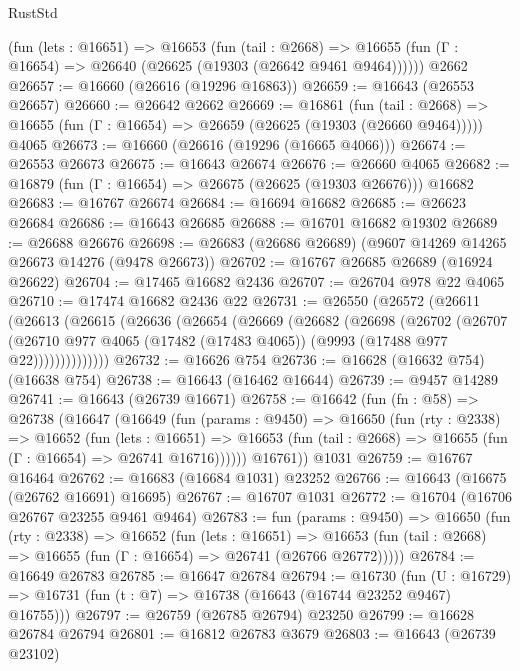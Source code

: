 \begin{lexlean}{RustStd}
\begin{coremodule}
    (fun (lets : @16651) =>
    @16653
      (fun (tail : @2668) =>
      @16655 (fun (Γ : @16654) => @26640 (@26625 (@19303 (@26642 @9461 @9464))))))
    @2662
@26657 := @16660 (@26616 (@19296 @16863))
@26659 := @16643 (@26553 @26657)
@26660 := @26642 @2662
@26669 := @16861
    (fun (tail : @2668) => @16655 (fun (Γ : @16654) => @26659 (@26625 (@19303 (@26660 @9464)))))
    @4065
@26673 := @16660 (@26616 (@19296 (@16665 @4066)))
@26674 := @26553 @26673
@26675 := @16643 @26674
@26676 := @26660 @4065
@26682 := @16879 (fun (Γ : @16654) => @26675 (@26625 (@19303 @26676))) @16682
@26683 := @16767 @26674
@26684 := @16694 @16682
@26685 := @26623 @26684
@26686 := @16643 @26685
@26688 := @16701 @16682 @19302
@26689 := @26688 @26676
@26698 := @26683 (@26686 @26689) (@9607 @14269 @14265 @26673 @14276 (@9478 @26673))
@26702 := @16767 @26685 @26689 (@16924 @26622)
@26704 := @17465 @16682 @2436
@26707 := @26704 @978 @22 @4065
@26710 := @17474 @16682 @2436 @22
@26731 := @26550
    (@26572
      (@26611
        (@26613
          (@26615
            (@26636
              (@26654
                (@26669
                  (@26682
                    (@26698
                      (@26702
                        (@26707
                          (@26710
                            @977
                            @4065
                            (@17482 (@17483 @4065))
                            (@9993 (@17488 @977 @22))))))))))))))
@26732 := @16626 @754
@26736 := @16628 (@16632 @754) (@16638 @754)
@26738 := @16643 (@16462 @16644)
@26739 := @9457 @14289
@26741 := @16643 (@26739 @16671)
@26758 := @16642
    (fun (fn : @58) =>
    @26738
      (@16647
        (@16649
          (fun (params : @9450) =>
          @16650
            (fun (rty : @2338) =>
            @16652
              (fun (lets : @16651) =>
              @16653 (fun (tail : @2668) => @16655 (fun (Γ : @16654) => @26741 @16716))))))
        @16761))
    @1031
@26759 := @16767 @16464
@26762 := @16683 (@16684 @1031) @23252
@26766 := @16643 (@16675 (@26762 @16691) @16695)
@26767 := @16707 @1031
@26772 := @16704 (@16706 @26767 @23255 @9461 @9464)
@26783 := fun (params : @9450) =>
  @16650
    (fun (rty : @2338) =>
    @16652
      (fun (lets : @16651) =>
      @16653 (fun (tail : @2668) => @16655 (fun (Γ : @16654) => @26741 (@26766 @26772)))))
@26784 := @16649 @26783
@26785 := @16647 @26784
@26794 := @16730
    (fun (U : @16729) => @16731 (fun (t : @7) => @16738 (@16643 (@16744 @23252 @9467) @16755)))
@26797 := @26759 (@26785 @26794) @23250
@26799 := @16628 @26784 @26794
@26801 := @16812 @26783 @3679
@26803 := @16643 (@26739 @23102)

\end{coremodule}
\end{lexlean}
